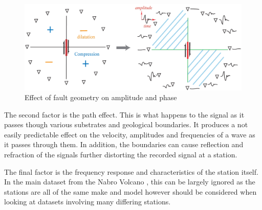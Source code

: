 \documentclass[../report.tex]{subfiles}
\begin{document}
\begin{figure}[H]
	\centering
	\includegraphics[width=1\linewidth]{img/fault_angle}
	\caption{Effect of fault geometry on amplitude and phase \citep{faultangle}}
	\label{fig:faultangle}
\end{figure}

	The second factor is the path effect.  This is what happens to the signal as it passes though various substrates and geological boundaries.  It produces a not easily predictable effect on the velocity, amplitudes and frequencies of a wave as it passes through them.  In addition, the boundaries can cause reflection and refraction of the signals further distorting the recorded signal at a station.
	
	The final factor is the frequency response and characteristics of the station itself.  In the main dataset from the Nabro Volcano \citep{eritrea1}, this can be largely ignored as the stations are all of the same make and model however should be considered when looking at datasets involving many differing stations.
\end{document}
